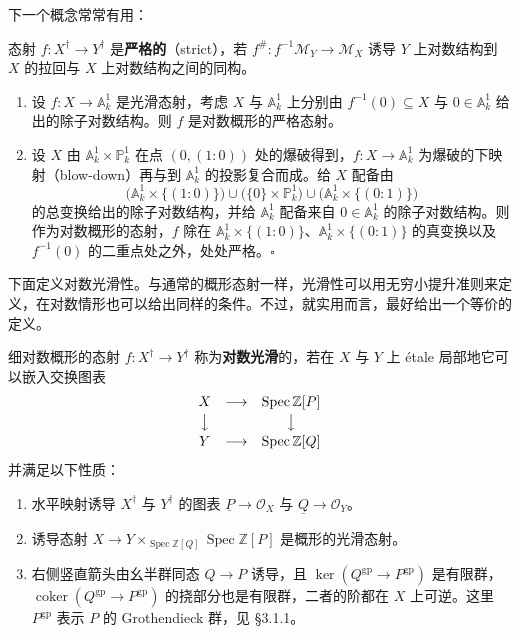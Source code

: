 下一个概念常常有用：

\begin{definition}
态射 $f:X^{\dagger}\to Y^{\dagger}$ 是\textbf{严格的}（strict），若 $f^{\#}:f^{-1}\mathcal{M}_Y\to\mathcal{M}_X$ 诱导 $Y$ 上对数结构到 $X$ 的拉回与 $X$ 上对数结构之间的同构。
\end{definition}

\begin{examples}
\begin{enumerate}[label=(\arabic*),leftmargin=2.2em,itemsep=3pt]
\item 设 $f:X\to\mathbb{A}^1_k$ 是光滑态射，考虑 $X$ 与 $\mathbb{A}^1_k$ 上分别由 $f^{-1}(0)\subseteq X$ 与 $0\in\mathbb{A}^1_k$ 给出的除子对数结构。则 $f$ 是对数概形的严格态射。
\item 设 $X$ 由 $\mathbb{A}^1_k\times\mathbb{P}^1_k$ 在点 $(0,(1:0))$ 处的爆破得到，$f:X\to\mathbb{A}^1_k$ 为爆破的下映射（blow-down）再与到 $\mathbb{A}^1_k$ 的投影复合而成。给 $X$ 配备由
\[
  \bigl(\mathbb{A}^1_k\times\{(1:0)\}\bigr)\cup
  \bigl(\{0\}\times\mathbb{P}^1_k\bigr)\cup
  \bigl(\mathbb{A}^1_k\times\{(0:1)\}\bigr)
\]
的总变换给出的除子对数结构，并给 $\mathbb{A}^1_k$ 配备来自 $0\in\mathbb{A}^1_k$ 的除子对数结构。则作为对数概形的态射，$f$ 除在 $\mathbb{A}^1_k\times\{(1:0)\}$、$\mathbb{A}^1_k\times\{(0:1)\}$ 的真变换以及 $f^{-1}(0)$ 的二重点处之外，处处严格。\hfill$\square$
\end{enumerate}
\end{examples}

下面定义对数光滑性。与通常的概形态射一样，光滑性可以用无穷小提升准则来定义，在对数情形也可以给出同样的条件。不过，就实用而言，最好给出一个等价的定义。

\begin{definition}
细对数概形的态射 $f:X^{\dagger}\to Y^{\dagger}$ 称为\textbf{对数光滑}的，若在 $X$ 与 $Y$ 上 étale 局部地它可以嵌入交换图表
\[
\begin{array}{ccc}
  X & \longrightarrow & \operatorname{Spec}\mathbb{Z}[P]\\[2pt]
  \big\downarrow & & \big\downarrow\\[2pt]
  Y & \longrightarrow & \operatorname{Spec}\mathbb{Z}[Q]
\end{array}
\]
并满足以下性质：
\begin{enumerate}[label=(\arabic*),leftmargin=2.2em,itemsep=2pt]
\item 水平映射诱导 $X^{\dagger}$ 与 $Y^{\dagger}$ 的图表 $\underline{P}\to\mathcal{O}_X$ 与 $\underline{Q}\to\mathcal{O}_Y$。
\item 诱导态射 $X\to Y\times_{\operatorname{Spec}\mathbb{Z}[Q]}\operatorname{Spec}\mathbb{Z}[P]$ 是概形的光滑态射。
\item 右侧竖直箭头由幺半群同态 $Q\to P$ 诱导，且 $\ker(Q^{\mathrm{gp}}\to P^{\mathrm{gp}})$ 是有限群，$\operatorname{coker}(Q^{\mathrm{gp}}\to P^{\mathrm{gp}})$ 的挠部分也是有限群，二者的阶都在 $X$ 上可逆。这里 $P^{\mathrm{gp}}$ 表示 $P$ 的 Grothendieck 群，见 §3.1.1。
\end{enumerate}
\end{definition}

